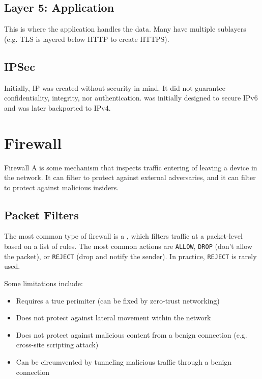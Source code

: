 \subsection*{Layer 5: Application}
This is where the application handles the data. Many have multiple sublayers (e.g. TLS is layered below HTTP to create HTTPS).

\subsection*{IPSec}
Initially, IP was created without security in mind. It did not guarantee confidentiality, integrity, nor authentication.  was initially designed to secure IPv6 and was later backported to IPv4.

\section{Firewall}

\begin{dfnbox}{Firewall}{}
    A  is some mechanism that inspects traffic entering of leaving a device in the network. It can filter  to protect against external adversaries, and it can filter  to protect against malicious insiders.
\end{dfnbox}

\subsection*{Packet Filters}
The most common type of firewall is a , which filters traffic at a packet-level based on a list of rules. The most common actions are \texttt{ALLOW}, \texttt{DROP} (don't allow the packet), or \texttt{REJECT} (drop and notify the sender). In practice, \texttt{REJECT} is rarely used.

Some limitations include:
\begin{itemize}
    \item Requires a true perimiter (can be fixed by zero-trust networking)
    \item Does not protect against lateral movement within the network
    \item Does not protect against malicious content from a benign connection (e.g. cross-site scripting attack)
    \item Can be circumvented by tunneling malicious traffic through a benign connection
\end{itemize}

